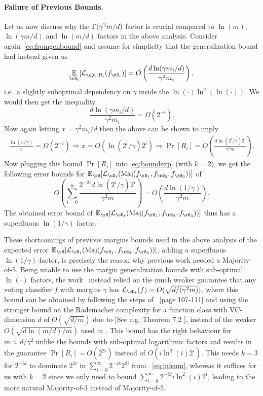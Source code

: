\paragraph{Failure of Previous Bounds.}
Let us now discuss why the $\operatorname{\Gamma}(\gamma^2 m/d)$ factor is crucial compared to $\ln(m)$, $\ln(\gamma m/d)$ and $\ln(m/d)$ factors in the above analysis. Consider again~\cref{eq:fromgenbound} and assume for simplicity that the generalization bound had instead given us
\begin{align}\label{eq:proofsketch0}
  \e_{\rS_i}[\ls_{\cD_t \mid R_i}(f_{\rS_i})] = O\left(\frac{d \ln(\gamma m_i/d)}{\gamma^2 m_i} \right),
\end{align}
i.e.\ a slightly suboptimal dependency on $\gamma$ inside the $\ln(\cdot) \ln^2(\ln(\cdot ))$. We would then get the inequality
\[
  \frac{d \ln(\gamma m_i/d)}{\gamma^2 m_i} = \Omega(2^{-i}).
\]
Now again letting $ x=\gamma^{2}m_{i}/d $ then the above can be shown to imply
\begin{align*}
  \frac{\ln(x/\gamma)}{x} = \Omega\left(2^{-i}\right) \Rightarrow x = O\left(\ln{\left(2^i/\gamma \right)} 2^{i} \right) \Rightarrow \Pr[R_i] = O\left( \frac{d\ln{\left(2^i/\gamma \right)}2^i}{\gamma^2m}\right).
\end{align*}
Now plugging this bound $ \Pr[R_{i}] $  into \cref{eq:boundexp} (with $ k=2 $), we get the following error bounds for $ \e_{\rS}[\ls_{\cD_t}(\maj(f_{\rS_{1}},f_{\rS_{2}},f_{\rS_{3}}))]  $ of
\[
  O\left( \sum_{i=0}^\infty \frac{2^{-2i}d \ln(2^i/\gamma) 2^i }{\gamma^2 m}\right) = O\left(\frac{d \ln(1/\gamma)}{\gamma^2 m} \right).
\]
The obtained error bound of $ \e_{\rS}[\ls_{\cD_t}(\maj(f_{\rS_{1}},f_{\rS_{2}},f_{\rS_{3}}))]  $ thus has a superfluous $ \ln{\left(1/\gamma \right)}$ factor.

These shortcomings of previous margins bounds used in the above analysis of the expected error $ \e_{\rS}[\ls_{\cD_t}(\maj(f_{\rS_{1}},f_{\rS_{2}},f_{\rS_{3}}))]  $, adding a superfluous $ \ln{\left(1/\gamma\right)} $-factor, is precisely the reason why previous work needed a Majority-of-5. Being unable to use the margin generalization bounds with sub-optimal $\ln( \cdot )$ factors, the work~\cite{manyfacesofoptimalweaktostronglearning} instead relied on the much weaker guarantee that any voting classifier $f$ with margins $\gamma$ has  $\ls_{\cD_t}(f) = O(\sqrt{d/(\gamma^2 m)}),$ where this bound can be obtained by following the steps of~\cite{boostingbook} [page 107-111] and using the stronger bound on the Rademacher complexity for a function class with VC-dimension $ d $ of $ O(\sqrt{d/m}) $ due to \cite{dudley} [See e.g. Theorem 7.2 \cite{rademacherboundlecturenotes}], instead of the weaker $ O(\sqrt{d\ln{\left(m/d \right)}/m})$ used in \cite{boostingbook}. This bound has the right behaviour for $m \approx d/\gamma^2$ unlike the bounds with sub-optimal logarithmic factors and results in the guarantee $\Pr[R_i] = O(2^{2i})$ instead of $O(i \ln^2(i) 2^i)$. This needs $k=3$ for $2^{-ik}$ to dominate $2^{2i}$ in $\sum_{i=0}^\infty 2^{-ik} 2^{2i}$ from ~\cref{eq:infsum}, whereas it suffices for us with $k=2$ since we only need to bound $\sum_{i=0}^\infty 2^{-ik} i \ln^2(i) 2^{i}$, leading to the more natural Majority-of-3 instead of Majority-of-5.

